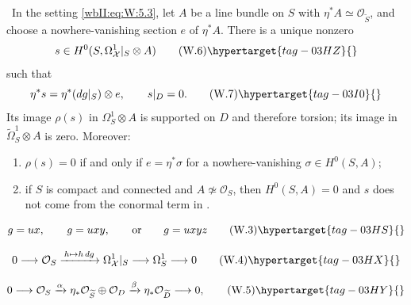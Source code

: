 
\begin{theorem}
\hypertarget{tag-03IK}{}\label{wbII:prop:conductor}

\label{wbII:prop:conductor-differential}
\ In the setting \eqref{wbII:eq:W:5.3}, let $A$ be a line bundle on $S$ with
$\eta^*A\simeq\mathcal O_{\widetilde S}$, and choose a nowhere-vanishing
section $e$ of $\eta^*A$.  There is a unique nonzero
\[
s\in H^0(S,\Omega^1_{\mathcal X}|_S\otimes A)
\tag{W.6}\hypertarget{tag-03HZ}{}\label{wbII:eq:W:5.6}
\]
such that
\[
\eta^*s=\eta^*(dg|_S)\otimes e,\qquad s|_D=0.
\tag{W.7}\hypertarget{tag-03I0}{}\label{wbII:eq:W:5.7}
\]
Its image $\rho(s)$ in $\Omega^1_S\otimes A$ is supported on $D$ and
therefore torsion; its image in
$\widetilde\Omega^1_S\otimes A$ is zero.  Moreover:
\begin{enumerate}[label=(\alph*)]
\item $\rho(s)=0$ if and only if $e=\eta^*\sigma$ for a nowhere-vanishing
$\sigma\in H^0(S,A)$;
\item if $S$ is compact and connected and $A\not\simeq\mathcal O_S$, then
$H^0(S,A)=0$ and $s$ does not come from the conormal term in .
\end{enumerate}
\end{theorem}

\[
g=ux,\qquad g=uxy,\qquad\text{or}\qquad g=uxyz
\tag{W.3}\hypertarget{tag-03HS}{}\label{wbII:eq:W:5.3}
\]

\[
0\longrightarrow\mathcal O_S
\xrightarrow{\,h\mapsto h\,dg\,}
\Omega^1_{\mathcal X}|_S\longrightarrow\Omega^1_S\longrightarrow0
\tag{W.4}\hypertarget{tag-03HX}{}\label{wbII:eq:W:5.4}
\]

\[
0\longrightarrow\mathcal O_S
\xrightarrow{\alpha}
\eta_*\mathcal O_{\widetilde S}\oplus\mathcal O_D
\xrightarrow{\beta}
\eta_*\mathcal O_{\widetilde D}
\longrightarrow0,
\tag{W.5}\hypertarget{tag-03HY}{}\label{wbII:eq:W:5.5}
\]

